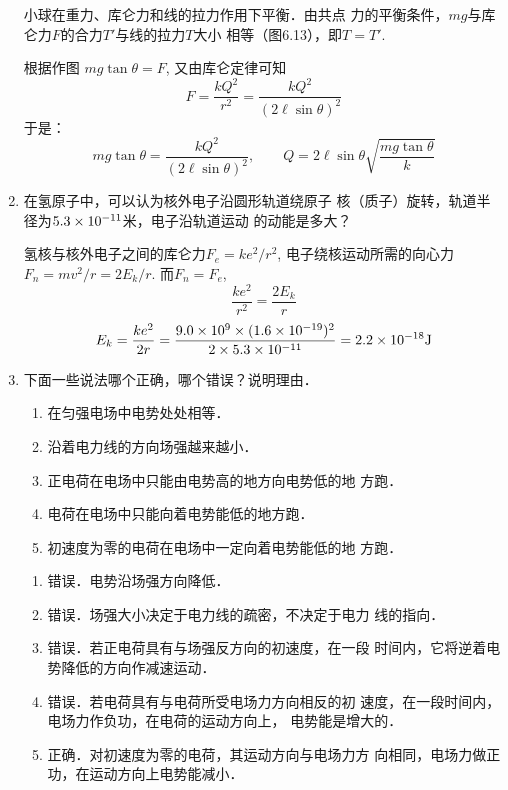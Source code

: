 \begin{enumerate}
\begin{figure}[htp]
\begin{minipage}[t]{0.48\textwidth}
\begin{tikzpicture}[>=latex]
\end{tikzpicture}
\caption{}
\end{minipage}
\end{figure}

\begin{solution}
    小球在重力、库仑力和线的拉力作用下平衡．由共点
    力的平衡条件，$mg$与库仑力$F$的合力$T'$与线的拉力$T$大小
    相等（图6.13），即$T=T'$.

    根据作图 $mg\tan\theta=F$, 又由库仑定律可知
\[F=\frac{kQ^2}{r^2}=\frac{kQ^2}{(2\ell\sin\theta)^2}\]
于是：
\[mg\tan\theta=\frac{kQ^2}{(2\ell\sin\theta)^2},\qquad Q=2\ell\sin\theta\sqrt{\frac{mg\tan\theta}{k}}\]
\end{solution}


\item 在氢原子中，可以认为核外电子沿圆形轨道绕原子
核（质子）旋转，轨道半径为$5.3\x10^{-11}$米，电子沿轨道运动
的动能是多大？

\begin{solution}
    氢核与核外电子之间的库仑力$F_e=ke^2/r^2$, 
    电子绕核运动所需的向心力$F_n=mv^2/r=2E_k/r$.
    而$F_n=F_e$,
    \[\frac{ke^2}{r^2}=\frac{2E_k}{r}\]
\[E_k=\frac{ke^2}{2r}=\frac{9.0\x10^9\x(1.6\x10^{-19})^2}{2\x 5.3\x 10^{-11}}=2.2\x 10^{-18}{\rm J}\]
\end{solution}

\item 下面一些说法哪个正确，哪个错误？说明理由．
\begin{enumerate}
\item 在匀强电场中电势处处相等．
\item 沿着电力线的方向场强越来越小．
\item 正电荷在电场中只能由电势高的地方向电势低的地
方跑．
\item 电荷在电场中只能向着电势能低的地方跑．
\item 初速度为零的电荷在电场中一定向着电势能低的地
方跑．
\end{enumerate}

\begin{solution}
\begin{enumerate}
    \item 错误．电势沿场强方向降低．
    \item 错误．场强大小决定于电力线的疏密，不决定于电力
    线的指向．
    \item 错误．若正电荷具有与场强反方向的初速度，在一段
    时间内，它将逆着电势降低的方向作减速运动．
    \item 错误．若电荷具有与电荷所受电场力方向相反的初
    速度，在一段时间内，电场力作负功，在电荷的运动方向上，
    电势能是增大的．
    \item 正确．对初速度为零的电荷，其运动方向与电场力方
    向相同，电场力做正功，在运动方向上电势能减小．
\end{enumerate}
\end{solution}


\end{enumerate}
